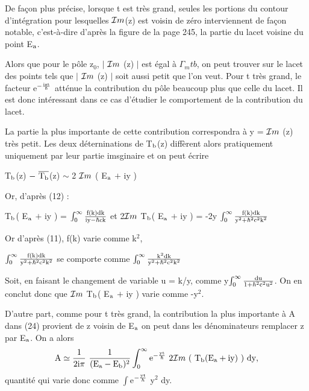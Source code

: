 De façon plus précise, lorsque t est très grand, seules les portions du contour d'intégration pour lesquelles $\mathcal{I}m$(z) est voisin de zéro interviennent de façon notable, c'est-à-dire d'après la figure de la page 245,
la partie du lacet voisine du point E$_{\text{a}}$.

Alors que pour le pôle z$_0$, $|$ $\mathcal{I}m$ (z) $|$ est égal à $\Gamma_mt{b}$, on peut
trouver sur le lacet des points tels que $|$ $\mathcal{I}m$ (z) $|$ soit aussi petit que l'on
veut. Pour t très grand, le facteur e$^{-\frac{\text{izt}}{\hbar}}$ atténue la contribution du pôle
beaucoup plus que celle du lacet. Il est donc intéressant dans ce cas d'étudier
le comportement de la contribution du lacet.

La partie la plus importante de cette contribution correspondra
à y = $\mathcal{I}m$ (z) très petit. Les deux déterninations de T$_{\text{b}}$(z) diffèrent alors pratiquement uniquement par leur partie imsginaire et on peut écrire
\begin{center}
T$_{\text{b}}$(z) $-\ \overline{\text{T}_{\text{b}}}$(z) $\sim$ 2 $\mathcal{I}m$ ( E$_{\text{a}}$ $+$ iy )
\end{center}

Or, d'après (12) :
\begin{center}
T$_{\text{b}}$( E$_{\text{a}}$ $+$ iy ) = $\int_0^\infty\frac{\text{f(k)dk}}{\text{iy} - \hbar\text{ck}}$
\hspace{1cm} et \hspace{1cm}
2$\mathcal{I}m$ T$_{\text{b}}$( E$_{\text{a}}$ $+$ iy ) = -2y $\int_0^\infty\frac{\text{f(k)dk}}{\text{y}^2 + \hbar^2\text{c}^2\text{k}^2}$
\end{center}

Or d'après (11), f(k) varie comme k$^2$,
\begin{center}
$\int_0^\infty\frac{\text{f(k)dk}}{\text{y}^2 + \hbar^2\text{c}^2\text{k}^2}$
\hspace{1cm} se comporte comme \hspace{1cm}
$\int_0^\infty\frac{\text{k}^2\text{dk}}{\text{y}^2 + \hbar^2\text{c}^2\text{k}^2}$
\end{center}
Soit, en faisant le changement de variable u = k/y,
comme y$\int_0^\infty\frac{\text{du}}{1+ \hbar^2\text{c}^2\text{u}^2}$.
On en conclut donc que $\mathcal{I}m$ T$_{\text{b}}$( E$_{\text{a}}$ $+$ iy ) varie comme -y$^2$.

D'autre part, comme pour t très grand, la contribution la plus
importante à A dans (24) provient de z voisin de E$_{\text{a}}$ on peut dans les dénominateurs remplacer z par E$_{\text{a}}$. On a alors
\[
\mt{A}\simeq\frac{1}{2\mt{i}\pi}\ \frac{1}{(\mt{E}_\mt{a}-\mt{E}_\mt{b})^2}\int_0^\infty\mt{e}^{-\frac{\mt{yt}}{\hbar}}
\ 2\mc{I}m\ (\ \mt{T}_\mt{b}(\mt{E}_\mt{a}+\mt{iy})\ )\ \mt{dy},
\]
quantité qui varie donc comme $\int$e$^{-\frac{\text{yt}}{\hbar}}$ y$^2$ dy.


